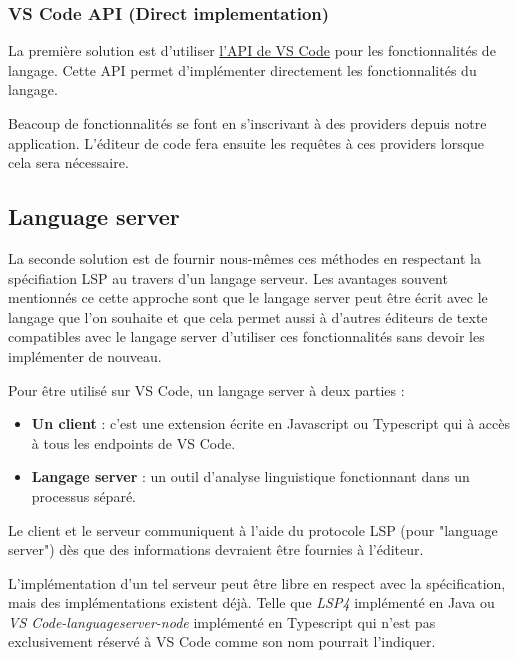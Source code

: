 \documentclass[
    iict, %
    il, %
]{heig-tb}
\begin{document}
\subsubsection{VS Code API (Direct implementation)}
La première solution est d'utiliser \href{https://code.visualstudio.com/api/references/vscode-api#languages}{l'API de VS Code} pour les fonctionnalités de langage.
Cette API permet d'implémenter directement les fonctionnalités du langage.

Beacoup de fonctionnalités se font en s'inscrivant à des providers depuis notre application.
L'éditeur de code fera ensuite les requêtes à ces providers lorsque cela sera nécessaire.

\subsection{Language server}

La seconde solution est de fournir nous-mêmes ces méthodes en respectant la spécifiation LSP \cite{lsp-specification} au travers d'un langage serveur.
Les avantages souvent mentionnés ce cette approche sont que le langage server peut être écrit avec le langage que l'on souhaite et
que cela permet aussi à d'autres éditeurs de texte compatibles avec le langage server d'utiliser ces fonctionnalités sans devoir les implémenter de nouveau.

Pour être utilisé sur VS Code, un langage server à deux parties :
\begin{itemize}
    \item \textbf{Un client} : c'est une extension écrite en Javascript ou Typescript qui à accès à tous les endpoints de VS Code.
    \item \textbf{Langage server} : un outil d'analyse linguistique fonctionnant dans un processus séparé.
\end{itemize}

\vspace{\parskip}

Le client et le serveur communiquent à l'aide du protocole LSP (pour "language server") dès que des informations devraient être fournies à l'éditeur.

L'implémentation d'un tel serveur peut être libre en respect avec la spécification, mais des implémentations existent déjà. Telle que \emph{LSP4} implémenté en Java ou \emph{VS Code-languageserver-node}
implémenté en Typescript qui n'est pas exclusivement réservé à VS Code comme son nom pourrait l'indiquer.
\end{document}

